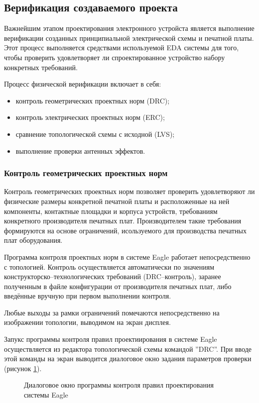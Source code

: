 \subsection{Верификация создаваемого проекта}
Важнейшим этапом проектирования электронного устройста является выполнение
верификации созданных принципиальной электрической схемы и печатной платы.
Этот процесс выполняется средствами используемой EDA системы
для того, чтобы проверить удовлетворяет ли спроектированное устройство набору
конкретных требований.

Процесс физической верификации включает в себя:
\begin{itemize}
	\item{} контроль геометрических проектных норм (DRC);
	\item{} контроль электрических проектных норм (ERC);
	\item{} сравнение топологической схемы с исходной (LVS);
	\item{} выполнение проверки антенных эффектов.
\end{itemize}


\subsubsection{Контроль геометрических проектных норм}
Контроль геометрических проектных норм позволяет проверить удовлетворяют ли физические
размеры конкретной печатной платы и расположенные на ней компоненты, контактные
площадки и корпуса устройств, требованиям конкретного производителя печатных плат.
Производителем такие требования формируются на основе ограничений, исользуемого для
производства печатных плат оборудования.

Программа контроля проектных норм в системе Eagle работает непосредственно с топологией.
Контроль осуществляется автоматически по значениям конструкторско--технологических
требований (DRC--контроль), заранее полученным в файле конфигурации от производителя
печатных плат, либо введённые вручную при первом выполнении контроля.

Любые выходы за рамки ограничений помечаются непосредственно на изображении топологии,
выводимом на экран дисплея.

Запукс программы контроля правил проектиирования в системе Eagle осуществляется из
редактора топологической схемы командой ''DRC''.  При вводе этой команды на экран
выводится диалоговое окно задания параметров проверки (рисунок \ref{img:drc}).
\begin{figure}[ht]
	\caption{Диалоговое окно программы контроля правил проектирования системы Eagle}
	\label{img:drc}
\end{figure}

